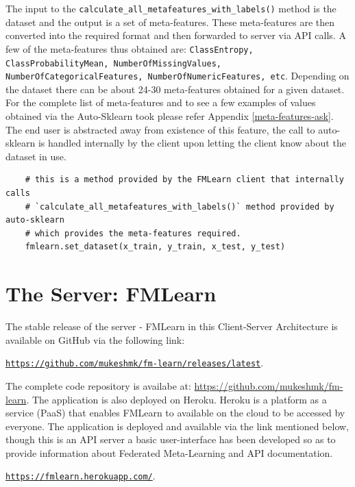 The input to the \texttt{calculate\_all\_metafeatures\_with\_labels()} method is the dataset and the output is a set of meta-features. These meta-features are then converted into the required format and then forwarded to server via API calls. A few of the meta-features thus obtained are: \texttt{ClassEntropy, ClassProbabilityMean, NumberOfMissingValues, NumberOfCategoricalFeatures, NumberOfNumericFeatures, etc}. Depending on the dataset there can be about 24-30 meta-features obtained for a given dataset. For the complete list of meta-features and to see a few examples of values obtained via the Auto-Sklearn took please refer Appendix \ref{meta-features-ask}. The end user is abstracted away from existence of this feature, the call to auto-sklearn is handled internally by the client upon letting the client know about the dataset in use.

\begin{lstlisting}
    # this is a method provided by the FMLearn client that internally calls
    # `calculate_all_metafeatures_with_labels()` method provided by auto-sklearn
    # which provides the meta-features required.
    fmlearn.set_dataset(x_train, y_train, x_test, y_test)
\end{lstlisting}

\section{The Server: FMLearn}
\label{fmlearn-server}

The stable release of the server - FMLearn in this Client-Server Architecture is available on GitHub via the following link:

\begin{center}
\href{https://github.com/mukeshmk/fm-learn/releases/latest}
{\texttt{https://github.com/mukeshmk/fm-learn/releases/latest}}.
\end{center}

The complete code repository is availabe at: \href{https://github.com/mukeshmk/fm-learn}{https://github.com/mukeshmk/fm-learn}. The application is also deployed on Heroku. Heroku is a platform as a service (PaaS) that enables FMLearn to available on the cloud to be accessed by everyone. The application is deployed and available via the link mentioned below, though this is an API server a basic user-interface has been developed so as to provide information about Federated Meta-Learning and API documentation.

\begin{center}
\href{https://fmlearn.herokuapp.com/}
{\texttt{https://fmlearn.herokuapp.com/}}.
\end{center}


